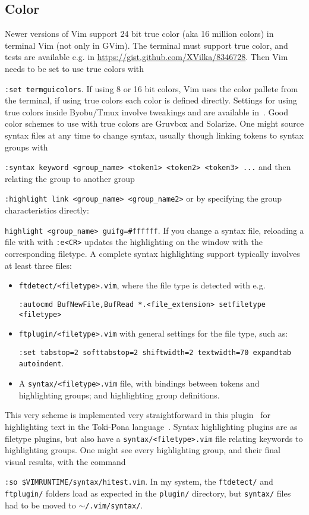 \documentclass{article}
\newcommand{\tttt}[1] {
	\texttt{#1}}
\begin{document}
\subsection{Color}\label{visual2}
Newer versions of Vim support 24 bit true color (aka 16 million colors)
in terminal Vim (not only in GVim).
The terminal must support true color, and tests are available e.g. in
\url{https://gist.github.com/XVilka/8346728}.
Then Vim needs to be set to use true colors with
\tttt{:set termguicolors}.
If using 8 or 16 bit colors, Vim uses the color pallete from the
terminal, if using true colors each color is defined directly.
Settings for using true colors inside Byobu/Tmux involve tweakings
and are available in~\cite{vimrc}.
Good color schemes to use with true colors are Gruvbox
and Solarize.
One might source syntax files at any time to change syntax, usually
though linking tokens to syntax groups with
\tttt{:syntax keyword <group\_name> <token1> <token2> <token3> ...}
and then relating the group to another group 
\tttt{:highlight link <group\_name> <group\_name2>}
or by specifying the group characteristics directly:
\tttt{highlight <group\_name> guifg=\#ffffff}.
If you change a syntax file, reloading a file with with \tttt{:e<CR>}
updates the highlighting on the window with the corresponding filetype.
A complete syntax highlighting support typically involves at least three files:
\begin{itemize}
  \item \tttt{ftdetect/<filetype>.vim}, where the file type is
    detected with e.g.
    \tttt{:autocmd BufNewFile,BufRead *.<file\_extension> setfiletype <filetype>}
  \item \tttt{ftplugin/<filetype>.vim} with general settings for the
    file type, such as: 
    \tttt{:set tabstop=2 softtabstop=2 shiftwidth=2 textwidth=70
    expandtab autoindent}.
  \item A \tttt{syntax/<filetype>.vim} file, with bindings between
    tokens and highlighting groups; and highlighting group definitions.
\end{itemize}

This very scheme is implemented very straightforward in this
plugin~\cite{tokipona}
for highlighting text in the Toki-Pona language~\cite{tpLang}.
Syntax highlighting plugins are as filetype plugins,
but also have a \tttt{syntax/<filetype>.vim} file
relating keywords to highlighting groups. 
One might see every highlighting group, and their final visual results,
with the command
\tttt{:so \$VIMRUNTIME/syntax/hitest.vim}.
In my system, the \tttt{ftdetect/} and \tttt{ftplugin/} folders load as expected in the \tttt{plugin/}
directory, but \tttt{syntax/} files had to be moved to \tttt{$\sim$/.vim/syntax/}.
\end{document}
